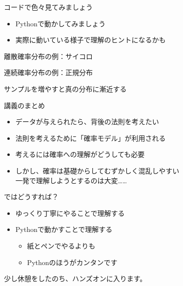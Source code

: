 \documentclass[dvipdfmx,cjk,handout]{beamer}
\begin{document}
\begin{frame}{コードで色々見てみましょう} \pause

\begin{itemize}
    \item Pythonで動かしてみましょう
    \item 実際に動いている様子で理解のヒントになるかも
\end{itemize}

\end{frame}


\begin{frame}{離散確率分布の例：サイコロ}


\end{frame}


\begin{frame}{連続確率分布の例：正規分布}


\end{frame}


\begin{frame}{サンプルを増やすと真の分布に漸近する}


\end{frame}



\begin{frame}{講義のまとめ} \pause

\begin{itemize}
    \item データが与えられたら、背後の法則を考えたい \pause
    \item 法則を考えるために「確率モデル」が利用される \pause
    \item 考えるには確率への理解がどうしても必要 \pause
    \item しかし、確率は基礎からしてむずかしく混乱しやすい\\
          一発で理解しようとするのは大変…… \pause
\end{itemize}

\vskip 0.3cm
ではどうすれば？ \pause

\begin{itemize}
    \item ゆっくり丁寧にやることで理解する \pause
    \item Pythonで動かすことで理解する \pause
        \begin{itemize}
        \item 紙とペンでやるよりも
        \item Pythonのほうがカンタンです
        \end{itemize}
\end{itemize} \pause

\vskip 0.3cm
少し休憩をしたのち、ハンズオンに入ります。

\end{frame}
\end{document}

